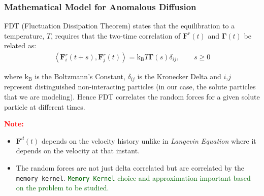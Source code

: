 \documentclass[a4paper,10pt]{beamer}
\newcommand{\BS}[1]{\boldsymbol{#1}}
\newcommand{\angbrac}[1]{\left \langle #1 \right \rangle}
\begin{document}
	\begin{frame}
		\small
		\frametitle{Mathematical Model for Anomalous Diffusion}
		\begin{theorem}
			FDT (Fluctuation Dissipation Theorem) states that the equilibration to a temperature, $T$, requires that the two-time correlation of $\BS{F}^{r}(t)$ and $\BS{\Gamma}(t)$ be related as:
			\begin{align}
				\angbrac{\BS{F}^{r}_{i}(t+s),\BS{F}^{r}_{j}(t)} = \text{k}_{\text{B}} T \BS{\Gamma}(s) \delta_{ij}, \qquad s \geq 0
			\end{align}
		\end{theorem}
		where $\text{k}_{\text{B}}$ is the Boltzmann's Constant, $\delta_{ij}$ is the Kronecker Delta and $i$,$j$ represent distinguished non-interacting particles (in our case, the solute particles that we are modeling). Hence FDT correlates the random forces for a given solute particle at different times.
		\linebreak
		
		
		\textcolor{red}{\textbf{Note:}}
		\begin{itemize}
			\item {$\BS{F}^{d}(t)$ depends on the velocity history unlike in \textit{Langevin Equation}} where it depends on the velocity at that instant.
			\item {The random forces are not just delta correlated but are correlated by the \texttt{memory kernel}. \textcolor{darkgreen}{\texttt{Memory Kernel} choice and approximation important based on the problem to be studied.}}
		\end{itemize}
	\end{frame}
	
\end{document}
